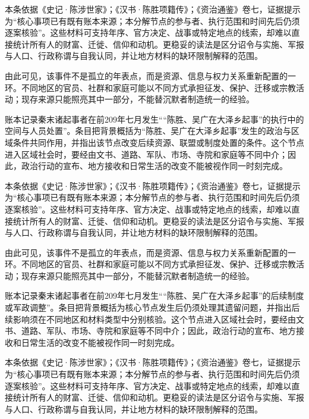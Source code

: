 本条依据《史记·陈涉世家》；《汉书·陈胜项籍传》；《资治通鉴》卷七，证据提示为“核心事项已有既有账本来源；本分解节点的参与者、执行范围和时间先后仍须逐案核验”。这些材料可支持年序、官方决定、战事或特定地点的线索，却难以直接统计所有人的财富、迁徙、信仰和动机。更稳妥的读法是区分诏令与实施、军报与人口、行政称谓与自我认同，并让地方材料的缺环限制解释的范围。

由此可见，该事件不是孤立的年表点，而是资源、信息与权力关系重新配置的一环。不同地区的官员、社群和家庭可能以不同方式承担征发、保护、迁移或宗教活动；现存来源只能照亮其中一部分，不能替沉默者制造统一的经验。

账本记录秦末诸起事者在前209年七月发生““陈胜、吴广在大泽乡起事”的执行中的空间与人员处置”。条目把背景概括为“陈胜、吴广在大泽乡起事”发生的政治与区域条件共同作用，并指出该节点改变后续资源、联盟或制度处置的条件。这个节点进入区域社会时，要经由文书、道路、军队、市场、寺院和家庭等不同中介；因此，政治行动的宣布、地方接收和日常生活的改变不能被视作同一时刻完成。

本条依据《史记·陈涉世家》；《汉书·陈胜项籍传》；《资治通鉴》卷七，证据提示为“核心事项已有既有账本来源；本分解节点的参与者、执行范围和时间先后仍须逐案核验”。这些材料可支持年序、官方决定、战事或特定地点的线索，却难以直接统计所有人的财富、迁徙、信仰和动机。更稳妥的读法是区分诏令与实施、军报与人口、行政称谓与自我认同，并让地方材料的缺环限制解释的范围。

由此可见，该事件不是孤立的年表点，而是资源、信息与权力关系重新配置的一环。不同地区的官员、社群和家庭可能以不同方式承担征发、保护、迁移或宗教活动；现存来源只能照亮其中一部分，不能替沉默者制造统一的经验。

账本记录秦末诸起事者在前209年七月发生““陈胜、吴广在大泽乡起事”的后续制度或军政调整”。条目把背景概括为核心节点发生后仍须处理其遗留问题，并指出后续影响须在不同地区和材料类型中分别核验。这个节点进入区域社会时，要经由文书、道路、军队、市场、寺院和家庭等不同中介；因此，政治行动的宣布、地方接收和日常生活的改变不能被视作同一时刻完成。

本条依据《史记·陈涉世家》；《汉书·陈胜项籍传》；《资治通鉴》卷七，证据提示为“核心事项已有既有账本来源；本分解节点的参与者、执行范围和时间先后仍须逐案核验”。这些材料可支持年序、官方决定、战事或特定地点的线索，却难以直接统计所有人的财富、迁徙、信仰和动机。更稳妥的读法是区分诏令与实施、军报与人口、行政称谓与自我认同，并让地方材料的缺环限制解释的范围。

